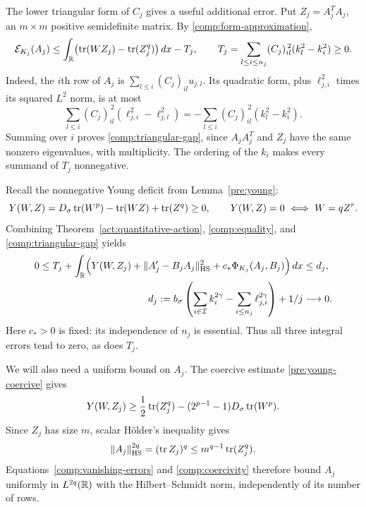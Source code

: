The lower triangular form of $C_j$ gives a useful additional error.  Put
$Z_j=A_j^TA_j$, an $m\times m$ positive semidefinite matrix.  By
\eqref{comp:form-approximation},
\begin{equation}
 \mathcal E_{K_j}(A_j)
 \leq\int_{\mathbb R}\bigl(\operatorname{tr}(WZ_j)-\operatorname{tr}(Z_j^q)\bigr)\,dx-T_j,
 \qquad
 T_j=\sum_{l\leq i\leq n_j}(C_j)_{il}^{\,2}(k_l^2-k_i^2)\geq0.
 \label{comp:triangular-gap}
\end{equation}
Indeed, the $i$th row of $A_j$ is $\sum_{l\leq i}(C_j)_{il}u_{j,l}$.
Its quadratic form, plus $\ell_{j,i}^2$ times its squared $L^2$ norm, is
at most
\[
 \sum_{l\leq i}(C_j)_{il}^{\,2}
      (\ell_{j,i}^2-\ell_{j,l}^2)
 =-\sum_{l\leq i}(C_j)_{il}^{\,2}(k_l^2-k_i^2).
\]
Summing over $i$ proves \eqref{comp:triangular-gap}, since $A_jA_j^T$ and
$Z_j$ have the same nonzero eigenvalues, with multiplicity.  The ordering
of the $k_i$ makes every summand of $T_j$ nonnegative.

Recall the nonnegative Young deficit from Lemma~\ref{pre:young}:
\begin{equation}
 Y(W,Z)=D_\sigma\operatorname{tr}(W^p)-\operatorname{tr}(WZ)+\operatorname{tr}(Z^q)\geq0,
 \qquad
 Y(W,Z)=0\ \Longleftrightarrow\ W=qZ^r.
 \label{comp:young-deficit}
\end{equation}
Combining Theorem~\ref{act:quantitative-action},
\eqref{comp:equality}, and \eqref{comp:triangular-gap} yields
\begin{align}
 0\leq T_j+\int_{\mathbb R}\Bigl(
   Y(W,Z_j)+\|A_j'-B_jA_j\|_{\mathrm{HS}}^2
       +c_*\Phi_{K_j}(A_j,B_j)\Bigr)\,dx
 &\leq d_j,\label{comp:vanishing-errors}\\
 d_j:=b_\sigma\left(
    \sum_{i\in\mathcal I}k_i^{2\gamma}
       -\sum_{i\leq n_j}\ell_{j,i}^{2\gamma}\right)+1/j
 &\longrightarrow0.\notag
\end{align}
Here $c_*>0$ is fixed: its independence of $n_j$ is essential.  Thus all
three integral errors tend to zero, as does $T_j$.

We will also need a uniform bound on $A_j$.  The coercive estimate
\eqref{pre:young-coercive} gives
\begin{equation}
 Y(W,Z_j)\geq\frac12\operatorname{tr}(Z_j^q)
       -(2^{p-1}-1)D_\sigma\operatorname{tr}(W^p).
 \label{comp:coercivity}
\end{equation}
Since $Z_j$ has size $m$, scalar H\"older's inequality gives
\[
 \|A_j\|_{\mathrm{HS}}^{2q}=(\operatorname{tr} Z_j)^q
       \leq m^{q-1}\operatorname{tr}(Z_j^q).
\]
Equations~\eqref{comp:vanishing-errors} and \eqref{comp:coercivity}
therefore bound $A_j$ uniformly in $L^{2q}(\mathbb R)$ with the
Hilbert--Schmidt norm, independently of its number of rows.


